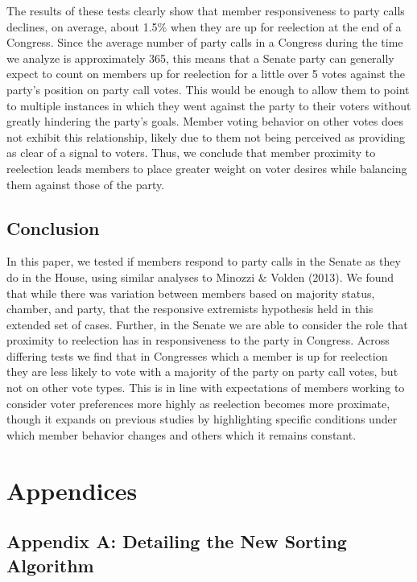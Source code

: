 \documentclass[12pt]{article}
\begin{document}
The results of these tests clearly show that member responsiveness to party calls declines, on average, about 1.5\% when they are up for reelection at the end of a Congress. Since the average number of party calls in a Congress during the time we analyze is approximately 365, this means that a Senate party can generally expect to count on members up for reelection for a little over 5 votes against the party's position on party call votes. This would be enough to allow them to point to multiple instances in which they went against the party to their voters without greatly hindering the party's goals. Member voting behavior on other votes does not exhibit this relationship, likely due to them not being perceived as providing as clear of a signal to voters. Thus, we conclude that member proximity to reelection leads members to place greater weight on voter desires while balancing them against those of the party.

\subsection{Conclusion}

In this paper, we tested if members respond to party calls in the Senate as they do in the House, using similar analyses to Minozzi \& Volden (2013). We found that while there was variation between members based on majority status, chamber, and party, that the responsive extremists hypothesis held in this extended set of cases. Further, in the Senate we are able to consider the role that proximity to reelection has in responsiveness to the party in Congress. Across differing tests we find that in Congresses which a member is up for reelection they are less likely to vote with a majority of the party on party call votes, but not on other vote types. This is in line with expectations of members working to consider voter preferences more highly as reelection becomes more proximate, though it expands on previous studies by highlighting specific conditions under which member behavior changes and others which it remains constant.

\pagebreak

\section{Appendices}

\subsection{Appendix A: Detailing the New Sorting Algorithm}
\end{document}
